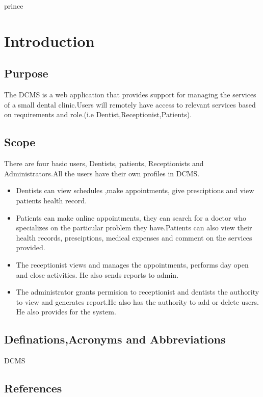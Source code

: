 \documentclass[11pt]{article}
\begin{document}
\begin{titlepage}
\begin{center}
 prince
\end{center}
 \end{titlepage}
 \tableofcontents
 \newpage
\section{Introduction}\label{sec:intro}
\subsection{Purpose}
 The DCMS is a web application that provides support for managing the services of a small dental clinic.Users will remotely have access to relevant services based on requirements and role.(i.e Dentist,Receptionist,Patients).
\subsection{Scope}
There are four basic users, Dentists, patients, Receptionists and Administrators.All the users have their own profiles in DCMS.
\begin{itemize}

\item 
Dentists can view schedules ,make appointments, give presciptions and view patients health record.
\item 
Patients can make online appointments, they can search for a doctor who specializes on the particular problem they have.Patients can also view their health  records, presciptions, medical expenses and comment on the services provided.
\item 
The receptionist views and manages the appointments, performs day open and close activities. He also sends reports to admin.
\item 
The administrator grants permision to receptionist  and  dentists the authority to view and generates report.He also has the authority to add or delete users. He also provides for the system.
\end{itemize}
\subsection{Definations,Acronyms and Abbreviations}

DCMS
\subsection{References}
\end{document}
